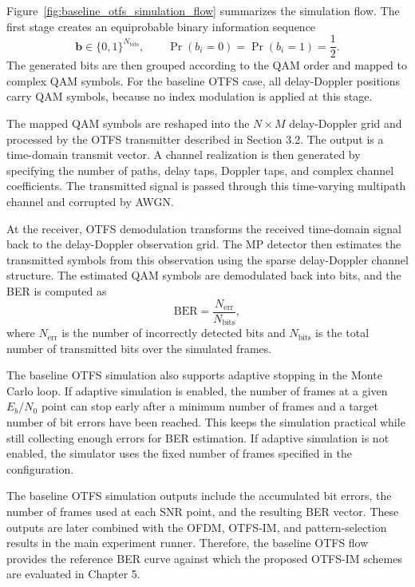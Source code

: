 Figure~\ref{fig:baseline_otfs_simulation_flow} summarizes the simulation flow. The first stage creates an equiprobable binary information sequence
\begin{equation}
    \mathbf{b}
    \in
    \{0,1\}^{N_{\mathrm{bits}}},
    \qquad
    \Pr(b_i=0)=\Pr(b_i=1)=\frac{1}{2}.
    \label{eq:baseline_random_bits}
\end{equation}
The generated bits are then grouped according to the QAM order and mapped to complex QAM symbols. For the baseline OTFS case, all delay-Doppler positions carry QAM symbols, because no index modulation is applied at this stage.

The mapped QAM symbols are reshaped into the \(N\times M\) delay-Doppler grid and processed by the OTFS transmitter described in Section 3.2. The output is a time-domain transmit vector. A channel realization is then generated by specifying the number of paths, delay taps, Doppler taps, and complex channel coefficients. The transmitted signal is passed through this time-varying multipath channel and corrupted by AWGN.

At the receiver, OTFS demodulation transforms the received time-domain signal back to the delay-Doppler observation grid. The MP detector then estimates the transmitted symbols from this observation using the sparse delay-Doppler channel structure. The estimated QAM symbols are demodulated back into bits, and the BER is computed as
\begin{equation}
    \mathrm{BER}
    =
    \frac{N_{\mathrm{err}}}{N_{\mathrm{bits}}},
\end{equation}
where \(N_{\mathrm{err}}\) is the number of incorrectly detected bits and \(N_{\mathrm{bits}}\) is the total number of transmitted bits over the simulated frames.

The baseline OTFS simulation also supports adaptive stopping in the Monte Carlo loop. If adaptive simulation is enabled, the number of frames at a given \(E_b/N_0\) point can stop early after a minimum number of frames and a target number of bit errors have been reached. This keeps the simulation practical while still collecting enough errors for BER estimation. If adaptive simulation is not enabled, the simulator uses the fixed number of frames specified in the configuration.

The baseline OTFS simulation outputs include the accumulated bit errors, the number of frames used at each SNR point, and the resulting BER vector. These outputs are later combined with the OFDM, OTFS-IM, and pattern-selection results in the main experiment runner. Therefore, the baseline OTFS flow provides the reference BER curve against which the proposed OTFS-IM schemes are evaluated in Chapter 5.
